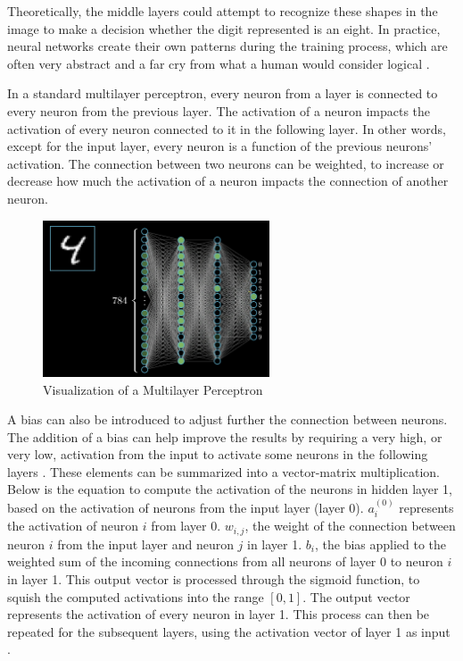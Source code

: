 ﻿\documentclass[12pt,a4paper,notitlepage]{article}
\begin{document}
Theoretically, the middle layers could attempt to recognize these shapes in the image to make a decision whether the digit represented is an eight. In practice, neural networks create their own patterns during the training process, which are often very abstract and a far cry from what a human would consider logical \cite{sanderson_gradient_2017}.

In a standard multilayer perceptron, every neuron from a layer is connected to every neuron from the previous layer. The activation of a neuron impacts the activation of every neuron connected to it in the following layer. In other words, except for the input layer, every neuron is a function of the previous neurons' activation. The connection between two neurons can be weighted, to increase or decrease how much the activation of a neuron impacts the connection of another neuron.
\begin{figure}[htbp]
 \centering
  \includegraphics[width=0.60\textwidth]{images/perceptron-visualisation.png}
 \caption{Visualization of a Multilayer Perceptron \cite{sanderson_gradient_2017}}
 \label{fig:perceptron-visualisation}
\end{figure}

A bias can also be introduced to adjust further the connection between neurons. The addition of a bias can help improve the results by requiring a very high, or very low, activation from the input to activate some neurons in the following layers \cite{sanderson_but_2017}.
These elements can be summarized into a vector-matrix multiplication. Below is the equation to compute the activation of the neurons in hidden layer 1, based on the activation of neurons from the input layer (layer 0). \(a_i^{(0)}\) represents the activation of neuron \(i\) from layer 0. \(w_{i,j}\), the weight of the connection between neuron \(i\) from the input layer and neuron \(j\) in layer 1. \(b_i\), the bias applied to the weighted sum of the incoming connections from all neurons of layer 0 to neuron \(i\) in layer 1. This output vector is processed through the sigmoid function, to squish the computed activations into the range \([0,1]\). The output vector represents the activation of every neuron in layer 1. This process can then be repeated for the subsequent layers, using the activation vector of layer 1 as input \cite{sanderson_but_2017}.
\end{document}
